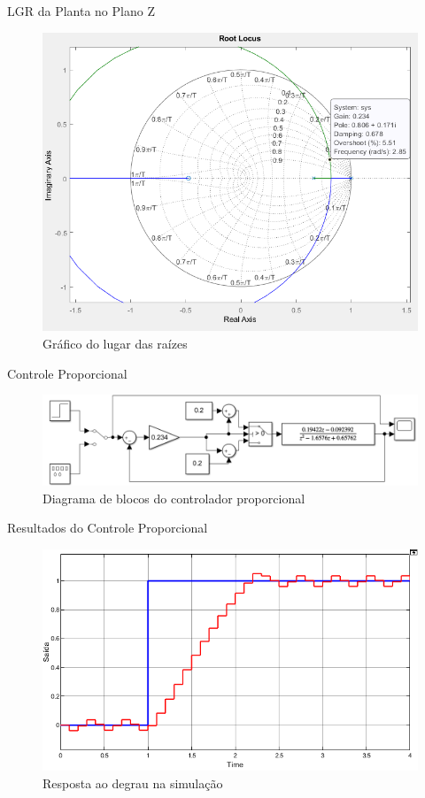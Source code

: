 \documentclass{beamer}
\begin{document}
\begin{frame}{LGR da Planta no Plano Z}
\begin{figure}
    \centering
    \includegraphics[width = 0.8 \linewidth]{src/tex/img/rlocus.PNG}
    \caption{Gráfico do lugar das raízes}
    \label{fig:control_1}
\end{figure}
\end{frame}

\begin{frame}{Controle Proporcional}
\begin{figure}
    \centering
    \includegraphics[width = \linewidth]{src/tex/img/controle_1.PNG}
    \caption{Diagrama de blocos do controlador proporcional}
    \label{fig:control_1}
\end{figure}
\end{frame}

\begin{frame}{Resultados do Controle Proporcional}
\begin{figure}
    \centering
    \includegraphics[width = \linewidth]{src/tex/img/saida_controle_1.png}
    \caption{Resposta ao degrau na simulação}
    \label{fig:control_1}
\end{figure}
\end{frame}
\end{document}

